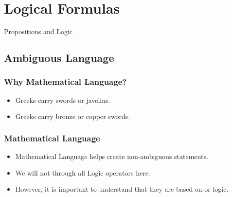 \section{Logical Formulas}

\frame{\tableofcontents[currentsection,hideallsubsections, firstsection=2, sections={2-4}]}

\begin{frame}
  \begin{center}
    Propositions and Logic
  \end{center}
\end{frame}

\subsection{Ambiguous Language}
\begin{frame}
  \frametitle{Why Mathematical Language?}

  \begin{itemize}
  \item Greeks carry swords or javelins.

    \bigskip

  \item Greeks carry bronze or copper swords.
  \end{itemize}
\end{frame}

\begin{frame}
  \frametitle{Mathematical Language}
  \begin{itemize}
  \item Mathematical Language helps create non-ambiguous statements.
    \bigskip

  \item We will not through all Logic operators here.
    \bigskip

  \item However, it is important to understand that they are based on
     or  logic.
  \end{itemize}
\end{frame}


